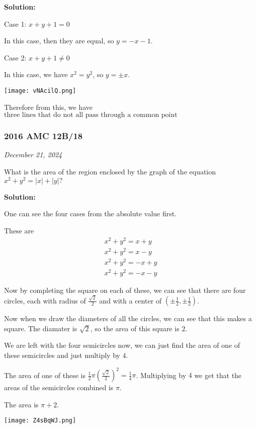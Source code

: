 \documentclass[../mathproblems.tex]{subfiles}
\begin{document}
\textbf{Solution:}

Case 1: $x+y+1=0$

In this case, then they are equal, so $y=-x-1$.

Case 2: $x+y+1\neq 0$

In this case, we have $x^2=y^2$, so $y=\pm x$. 

\begin{center}
    \texttt{[image: vNAcilQ.png]}
\end{center}

Therefore from this, we have $\boxed{\text{three lines that do not all pass through a common point}}$

\noindent\hrulefill

\subsubsection*{2016 AMC 12B/18}
\textit{December 21, 2024}

What is the area of the region enclosed by the graph of the equation $x^2+y^2=|x|+|y|?$

\textbf{Solution:}

One can see the four cases from the absolute value first.

These are 
\begin{align*}
x^2+y^2=x+y\\
x^2+y^2=x-y\\
x^2+y^2=-x+y\\
x^2+y^2=-x-y
\end{align*}

Now by completing the square on each of these, we can see that there are four circles, each with radius of $\frac{\sqrt{2}}{2}$ and with a center of $\left(\pm \frac{1}{2}, \pm \frac{1}{2}\right)$.

Now when we draw the diameters of all the circles, we can see that this makes a square. The diamater is $\sqrt{2}$, so the area of this square is $2$.

We are left with the four semicircles now, we can just find the area of one of these semicircles and just multiply by $4$.

The area of one of these is $\frac{1}{2}\pi \left(\frac{\sqrt{2}}{2}\right)^2 = \frac{1}{4}\pi$. Multiplying by $4$ we get that the areas of the semicircles combined is $\pi$.

The area is $\boxed{\pi + 2}$.

\begin{center}
    \texttt{[image: Z4sBqWJ.png]}
\end{center}
\end{document}
